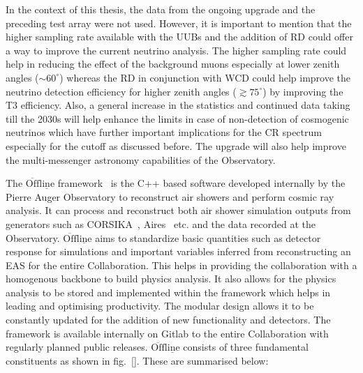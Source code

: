 In the context of this thesis, the data from the ongoing upgrade and the preceding test array were not used. However, it is important to mention that the higher sampling rate available with the UUBs and the addition of RD could offer a way to improve the current neutrino analysis. The higher sampling rate could help in reducing the effect of the background muons especially at lower zenith angles ($\sim 60^{\circ}$) whereas the RD in conjunction with WCD could help improve the neutrino detection efficiency for higher zenith angles ($\gtrsim 75^{\circ}$) by improving the T3 efficiency. Also, a general increase in the statistics and continued data taking till the 2030s will help enhance the limits in case of non-detection of cosmogenic neutrinos which have further important implications for the CR spectrum especially for the cutoff as discussed before. The upgrade will also help improve the multi-messenger astronomy capabilities of the Observatory. 



The $\mathrm{\overline{Off} \underline{line}}$ framework~\cite{Argiro:2007qg,PierreAuger:2023cqe} is the C++ based software developed internally by the Pierre Auger Observatory to reconstruct air showers and perform cosmic ray analysis. It can process and reconstruct both air shower simulation outputs from generators such as CORSIKA~\cite{Heck:1998vt}, Aires~\cite{Sciutto:1999jh} etc. and the data recorded at the Observatory. $\mathrm{\overline{Off} \underline{line}}$ aims to standardize basic quantities such as detector response for simulations and important variables inferred from reconstructing an EAS for the entire Collaboration. This helps in providing the collaboration with a homogenous backbone to build physics analysis. It also allows for the physics analysis to be stored and implemented within the framework which helps in leading and optimising productivity. The modular design allows it to be constantly updated for the addition of new functionality and detectors. The framework is available internally on Gitlab to the entire Collaboration with regularly planned public releases. $\mathrm{\overline{Off} \underline{line}}$ consists of three fundamental constituents as shown in fig.~\ref{}. These are summarised below:

